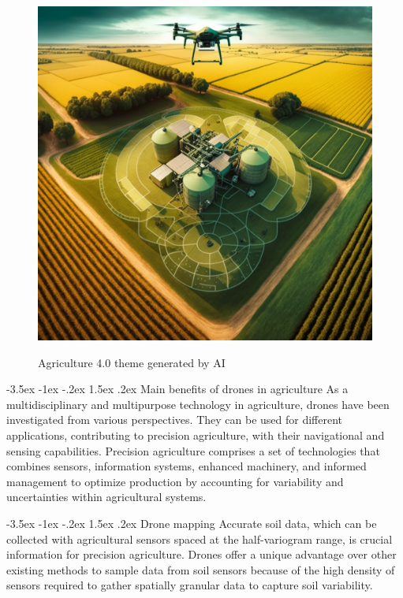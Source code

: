 \documentclass[a4paper,10pt]{article}
\makeatletter
\theoremstyle{definition}
\renewcommand\section{\@startsection {section}{1}{\z@}%
                                   {-3.5ex \@plus -1ex \@minus -.2ex}%
                                   {1.5ex \@plus.2ex}%
                                   {\large\bfseries}}
\renewcommand\subsection{\@startsection {subsection}{1}{\z@}%
                                   {-3.5ex \@plus -1ex \@minus -.2ex}%
                                   {1.5ex \@plus.2ex}%
                                   {\normalsize\bfseries}}
\makeatother
\begin{document}
\begin{figure}[h]
\begin{center}
\includegraphics[scale=0.27]{images/Fialin_agriculture_4.0_drone_scanning_0123ab8e-99cf-4ebe-9375-09f6d7ebec64.png}
\caption{Agriculture 4.0 theme generated by AI}
\cite{droneAI}
\label{fig:1}
\end{center}
\end{figure}

\section{Main benefits of drones in agriculture}
\label{sec:2}
As a multidisciplinary and multipurpose technology in agriculture, drones have been investigated from various perspectives. They can be used for different applications, contributing to precision agriculture, with their navigational and sensing capabilities. Precision agriculture comprises a set of technologies that combines sensors, information systems, enhanced machinery, and informed management to optimize production by accounting for variability and uncertainties within agricultural systems. \cite{REJEB2022107017}

\subsection{Drone mapping}
\label{subsec:1}
Accurate soil data, which can be collected with agricultural sensors spaced at the half-variogram range, is crucial information for precision agriculture. Drones offer a unique advantage over other existing methods to sample data from soil sensors because of the high density of sensors required to gather spatially granular data to capture soil variability. 
\end{document}
